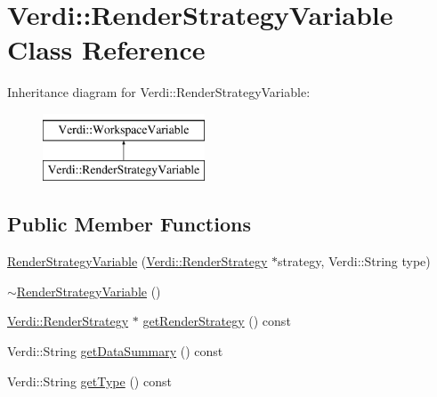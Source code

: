 \hypertarget{class_verdi_1_1_render_strategy_variable}{\section{\-Verdi\-:\-:\-Render\-Strategy\-Variable \-Class \-Reference}
\label{class_verdi_1_1_render_strategy_variable}
}
\-Inheritance diagram for \-Verdi\-:\-:\-Render\-Strategy\-Variable\-:\begin{figure}[H]
\begin{center}
\leavevmode
\includegraphics[height=2.000000cm]{class_verdi_1_1_render_strategy_variable}
\end{center}
\end{figure}
\subsection*{\-Public \-Member \-Functions}
\begin{DoxyCompactItemize}
\item 
\hyperlink{class_verdi_1_1_render_strategy_variable_af981bc6623d27c9523327c575e93aa42}{\-Render\-Strategy\-Variable} (\hyperlink{class_verdi_1_1_render_strategy}{\-Verdi\-::\-Render\-Strategy} $\ast$strategy, \-Verdi\-::\-String type)
\item 
\hyperlink{class_verdi_1_1_render_strategy_variable_ad197f1dcf6075d805b294c9001477bd1}{$\sim$\-Render\-Strategy\-Variable} ()
\item 
\hyperlink{class_verdi_1_1_render_strategy}{\-Verdi\-::\-Render\-Strategy} $\ast$ \hyperlink{class_verdi_1_1_render_strategy_variable_abec21769d3b7c28cbac2b3fa51f1a17e}{get\-Render\-Strategy} () const 
\item 
\-Verdi\-::\-String \hyperlink{class_verdi_1_1_render_strategy_variable_a77130948ca7d7fd32cf7ebf3094f13b5}{get\-Data\-Summary} () const 
\item 
\-Verdi\-::\-String \hyperlink{class_verdi_1_1_render_strategy_variable_a2a53cc9db3aca4c416f0c4ed83fc2dc1}{get\-Type} () const 
\end{DoxyCompactItemize}
